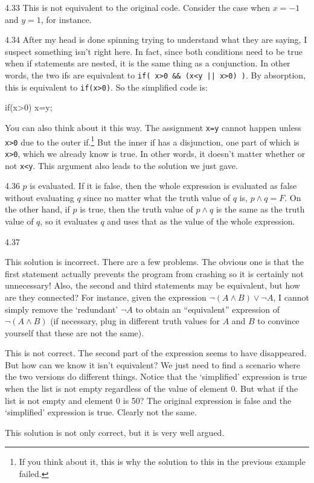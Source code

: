 \begin{Answer}{4.33}
This is not equivalent to the original code.  Consider the case when $x=-1$ and $y=1$, for instance.
\end{Answer}
\begin{Answer}{4.34}
After my head is done spinning trying to understand what they are
saying, I suspect something isn't right here. In fact,
since both conditions need to be true when if statements are nested, it is the same thing as a conjunction.
In other words, the two ifs are equivalent to \verb+if( x>0 && (x<y || x>0) )+.
By absorption, this is equivalent to \verb+if(x>0)+.
So the simplified code is:
\begin{code}
    if(x>0) {
        x=y;
    }
\end{code}
You can also think about it this way.  The assignment \verb+x=y+ cannot happen unless \verb+x>0+ due to the outer
if.\footnote{If you think about it, this is why the solution to this in the previous example failed.}
But the inner if has a disjunction, one part of which is \verb+x>0+, which we already know is true.
In other words, it doesn't matter whether or not \verb+x<y+.  This argument also leads to the solution we just gave.
\end{Answer}
\begin{Answer}{4.36}
$p$ is evaluated. If it is false, then the whole expression is evaluated
as false without evaluating $q$ since no matter what the truth
value of $q$ is, $p\wedge q=F$. On the other hand, if
$p$ is true, then the truth value of $p\wedge q$ is the same as
the truth value of $q$, so it evaluates $q$ and uses that as
the value of the whole expression.
\end{Answer}
\begin{Answer}{4.37}
\begin{solevalenum}
\item
This solution is incorrect.
There are a few problems.  The obvious one is that the first statement actually prevents the program
from crashing so it is certainly not unnecessary!  Also, the second and third statements may be equivalent,
but how are they connected?  For instance, given the expression $\neg (A\wedge B)\vee \neg A$,
I cannot simply remove the `redundant' $\neg A$ to obtain an ``equivalent'' expression of $\neg (A\wedge B)$
(if necessary, plug in different truth values for $A$ and $B$ to convince yourself that these are not the same).
\item
This is not correct.  The second part of the expression seems to have disappeared.
But how can we know it isn't equivalent?  We just need to find a scenario where the two versions do different
things. Notice that the `simplified' expression is true when the list is not empty regardless of the value of
element $0$.  But what if the list is not empty and element $0$ is 50?  The original expression is false and the
`simplified' expression is true.  Clearly not the same.
\item
This solution is not only correct, but it is very well argued.
\end{solevalenum}
\end{Answer}

